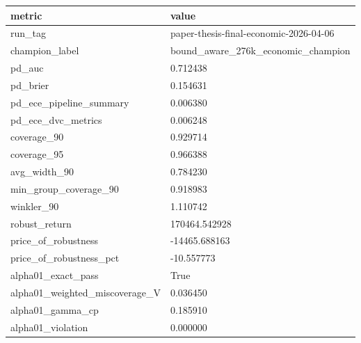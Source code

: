 \begin{tabular}{ll}
\toprule
metric & value \\
\midrule
run\_tag & paper-thesis-final-economic-2026-04-06 \\
champion\_label & bound\_aware\_276k\_economic\_champion \\
pd\_auc & 0.712438 \\
pd\_brier & 0.154631 \\
pd\_ece\_pipeline\_summary & 0.006380 \\
pd\_ece\_dvc\_metrics & 0.006248 \\
coverage\_90 & 0.929714 \\
coverage\_95 & 0.966388 \\
avg\_width\_90 & 0.784230 \\
min\_group\_coverage\_90 & 0.918983 \\
winkler\_90 & 1.110742 \\
robust\_return & 170464.542928 \\
price\_of\_robustness & -14465.688163 \\
price\_of\_robustness\_pct & -10.557773 \\
alpha01\_exact\_pass & True \\
alpha01\_weighted\_miscoverage\_V & 0.036450 \\
alpha01\_gamma\_cp & 0.185910 \\
alpha01\_violation & 0.000000 \\
\bottomrule
\end{tabular}
